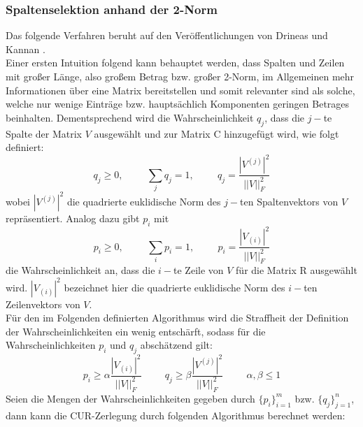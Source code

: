 \documentclass[12pt,a4paper,twoside]{article}
\begin{document}
		\subsubsection{Spaltenselektion anhand der 2-Norm}
		Das folgende Verfahren beruht auf den Veröffentlichungen von Drineas und Kannan \citep{drineas2003}. \\
		Einer ersten Intuition folgend kann behauptet werden, dass Spalten und Zeilen mit großer Länge, also großem 
		Betrag bzw. großer 2-Norm, im Allgemeinen mehr Informationen über eine Matrix bereitstellen und somit 
		relevanter sind als solche, welche nur wenige Einträge bzw. hauptsächlich Komponenten geringen Betrages 
		beinhalten. Dementsprechend wird die Wahrscheinlichkeit $q_j$, dass die $j-$te Spalte der Matrix $V$  
		ausgewählt und zur Matrix C hinzugefügt wird, wie folgt definiert:
		\begin{equation*}
			q_j\geq 0, \hspace{1cm} \sum_j q_j=1, \hspace{1cm} q_j=\frac{|V^{(j)}|^2}{||V||_F^2}
		\end{equation*}
		wobei $|V^{(j)}|^2$ die quadrierte euklidische Norm des $j-$ten Spaltenvektors von $V$ 
		repräsentiert. Analog dazu gibt $p_i$ mit
		\begin{equation*}
			p_i\geq 0, \hspace{1cm} \sum_i p_i=1, \hspace{1cm} p_i=\frac{|V_{(i)}|^2}{||V||_F^2}
		\end{equation*}
		die Wahrscheinlichkeit an, dass die $i-$te Zeile von $V$ für die Matrix R ausgewählt 
		wird. $|V_{(i)}|^2$ bezeichnet hier die quadrierte euklidische Norm des $i-$ten Zeilenvektors von $V$. \\
		Für den im Folgenden definierten Algorithmus wird die  Straffheit der Definition der Wahrscheinlichkeiten ein 
		wenig entschärft, sodass für die Wahrscheinlichkeiten $p_i$ und $q_j$ abschätzend gilt:
		\begin{equation}
			p_i\geq\alpha\frac{|V_{(i)}|^2}{||V||_F^2} \hspace{1cm} q_j\geq\beta\frac{|V^{(j)}|^2}{||V||_F^2} \hspace{1cm} \alpha,\beta \leq 1
		\end{equation}
		Seien die Mengen der Wahrscheinlichkeiten gegeben durch $\{p_i\}_{i=1}^m$ bzw. $\{q_j\}_{j=1}^n$, dann kann 
		die CUR-Zerlegung durch folgenden Algorithmus berechnet werden: \newpage
\end{document}
